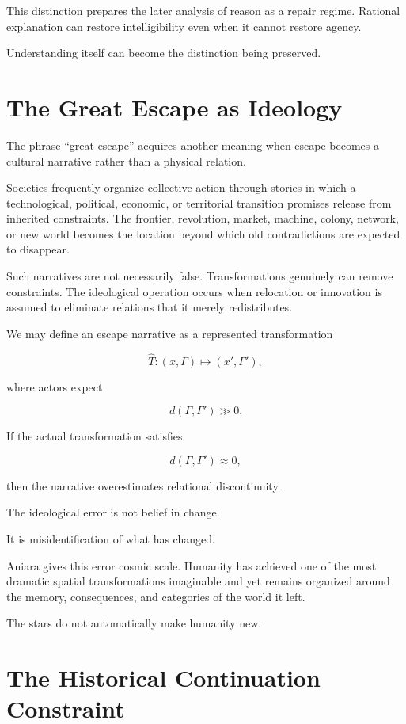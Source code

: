\documentclass[11pt,oneside]{book}
\theoremstyle{definition}
\theoremstyle{remark}
\begin{document}
This distinction prepares the later analysis of reason as a repair regime. Rational explanation can restore intelligibility even when it cannot restore agency.

Understanding itself can become the distinction being preserved.

\section{The Great Escape as Ideology}

The phrase ``great escape'' acquires another meaning when escape becomes a cultural narrative rather than a physical relation.

Societies frequently organize collective action through stories in which a technological, political, economic, or territorial transition promises release from inherited constraints. The frontier, revolution, market, machine, colony, network, or new world becomes the location beyond which old contradictions are expected to disappear.

Such narratives are not necessarily false. Transformations genuinely can remove constraints. The ideological operation occurs when relocation or innovation is assumed to eliminate relations that it merely redistributes.

We may define an escape narrative as a represented transformation

\[
\widehat T:
(x,\Gamma)
\mapsto
(x',\Gamma'),
\]

where actors expect

\[
d(\Gamma,\Gamma')\gg0.
\]

If the actual transformation satisfies

\[
d(\Gamma,\Gamma')\approx0,
\]

then the narrative overestimates relational discontinuity.

The ideological error is not belief in change.

It is misidentification of what has changed.

Aniara gives this error cosmic scale. Humanity has achieved one of the most dramatic spatial transformations imaginable and yet remains organized around the memory, consequences, and categories of the world it left.

The stars do not automatically make humanity new.

\section{The Historical Continuation Constraint}
\end{document}
